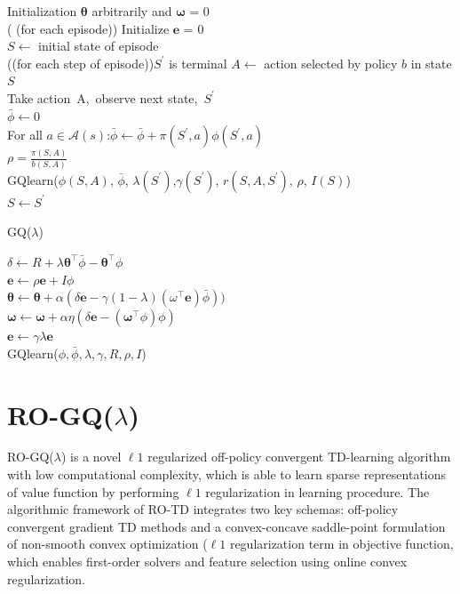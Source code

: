 \documentclass[conference]{IEEEtran}
\makeatletter
\newcommand{\removelatexerror}{\let\@latex@error\@gobble}
\makeatother
\begin{document}
{
\LinesNumbered
\removelatexerror%
\begin{algorithm}[H]
	\textup{Initialization $\pmb{\theta}$ arbitrarily and $\pmb{\omega}$ = 0} \\
	\Repeat({ (for each episode)}){}{
		\textup{Initialize $\pmb{e}$ = 0}\\
		\textup{$S\leftarrow$ initial state of episode}\\
		\Repeat({(for each step of episode)}){\textup{$S^{'}$ is terminal}}{
	  		\textup{$A\leftarrow$ action selected by policy $b$ in state $S$}\\
	  		\textup{Take action}\ A,\ \textup{observe next state,}\ $S^{'}$\\
	  		$\bar{\phi}\leftarrow 0$\\ 
	  \textup{For all $a \in \mathcal{A}(s)$:$\bar{\phi}\leftarrow\bar{\phi}+\pi(S^{'}, a)\phi(S^{'}, a)$}\\
	  $\rho = \frac{\pi(S, A)}{b(S, A)}$\\
	  	\textup{GQlearn($\phi(S, A)$, $\bar{\phi}$, $\lambda(S^{'})$,$ \gamma(S^{'})$, $r(S, A, S^{'})$, $\rho$, $I(S)$)}\\
	  $S\leftarrow S^{'}$
  	}
  	}
	\caption{GQ($\lambda$)}
\end{algorithm}
}
{
\LinesNumbered
\removelatexerror%
\begin{algorithm}[H]
$\delta\leftarrow R+\lambda \pmb{\theta}^{\top} \bar{\phi}-\pmb{\theta}^{\top}\phi$\\
$\pmb{e}\leftarrow \rho \pmb{e} + I \phi$\\
$\pmb{\theta} \leftarrow \pmb{\theta}+ \alpha (\delta \pmb{e} -\gamma(1-\lambda)(\omega^{\top}\pmb{e})\bar{\phi}))$\\
$\pmb{\omega}\leftarrow\pmb{\omega}+\alpha\eta(\delta\pmb{e}-(\pmb{\omega}^{\top}\phi)\phi)$\\
$\pmb{e}\leftarrow\gamma\lambda\pmb{e}$\\
 \caption{GQlearn($\phi,\bar{\phi},\lambda,\gamma, R, \rho, I$)}
\end{algorithm}
}
\section{RO-GQ($\lambda$)}
RO-GQ($\lambda$) is a novel $\ell1$ regularized off-policy convergent TD-learning algorithm with low computational complexity, which is able to learn sparse representations of value function by performing $\ell1$ regularization in learning procedure. The algorithmic framework of RO-TD integrates two key schemas: off-policy convergent gradient TD methods and a convex-concave saddle-point formulation of non-smooth convex optimization ($\ell1$ regularization term in objective function, which enables first-order solvers and feature selection using online convex regularization. \\
\end{document}
